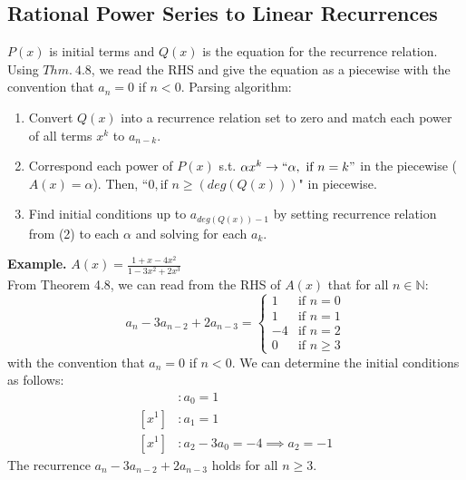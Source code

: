 \documentclass[11pt]{article}
\newenvironment{eg}[1]{
\begin{tcolorbox}[colback = white!15, arc=0pt,outer arc=0pt, colframe = black]
{\color{black} \textbf{Example.} #1} \\[5pt]
}
{
\end{tcolorbox}
}
\newcommand{\lstspacing}{\setlength\itemsep{1pt}}
\begin{document}
\subsection{Rational Power Series to Linear Recurrences}
$P(x)$ is initial terms and $Q(x)$ is the equation for the recurrence relation. Using $Thm. \: 4.8$, we read the RHS and give the equation as a piecewise with the convention that $a_n = 0$ if $n < 0$. Parsing algorithm:
\begin{enumerate}[(1)]
\lstspacing
    \item Convert $Q(x)$ into a recurrence relation set to zero and match each power of all terms $x^k$ to $a_{n - k}$. 
    \item Correspond each power of $P(x)$ s.t. $\alpha x^k \rightarrow ``\alpha, \text{ if } n = k"$ in the piecewise ($A(x) = \alpha$). Then, ``$0, \text{if } n \geq ( deg(Q(x)))$" in piecewise. 
    \item Find initial conditions up to $a_{deg(Q(x)) - 1}$ by setting recurrence relation from (2) to each $\alpha$ and solving for each $a_k$. 
\end{enumerate}
\begin{eg}{$A(x) = \frac{1+x-4x^2}{1-3x^2+2x^3}$}
From Theorem 4.8, we can read from the RHS of $A(x)$ that for all $n \in \mathbb{N}$:
    \[a_n - 3a_{n-2} + 2a_{n-3} =  \begin{cases} 
        1 &\text{if } n = 0\\
        1 &\text{if } n = 1\\
        -4 &\text{if } n = 2\\
        0 &\text{if } n \geq 3
    \end{cases}
    \]
    with the convention that $a_n = 0$ if $n < 0$. We can determine the initial conditions as follows: 
    \begin{align*}
        [x^0] &: a_0 = 1   \\
        [x^1] &: a_1 = 1 \\
        [x^1] &: a_2 - 3a_0 = -4 \implies a_2 = -1 
    \end{align*}
    The recurrence $a_n - 3a_{n-2} + 2a_{n-3}$ holds for all $n \geq 3$.
\end{eg}
\end{document}
